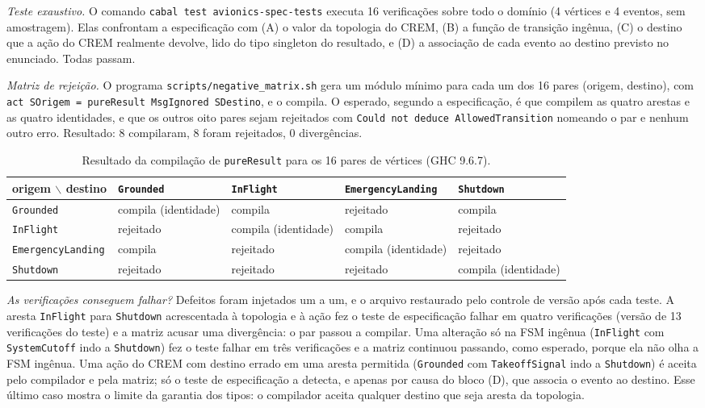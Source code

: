 \documentclass[12pt,a4paper]{article}
\begin{document}
\textit{Teste exaustivo.} O comando \texttt{cabal test avionics-spec-tests} executa 16 verificações sobre todo o domínio (4 vértices e 4 eventos, sem amostragem). Elas confrontam a especificação com (A) o valor da topologia do CREM, (B) a função de transição ingênua, (C) o destino que a ação do CREM realmente devolve, lido do tipo singleton do resultado, e (D) a associação de cada evento ao destino previsto no enunciado. Todas passam.

\textit{Matriz de rejeição.} O programa \texttt{scripts/negative\_matrix.sh} gera um módulo mínimo para cada um dos 16 pares (origem, destino), com \texttt{act SOrigem = pureResult MsgIgnored SDestino}, e o compila. O esperado, segundo a especificação, é que compilem as quatro arestas e as quatro identidades, e que os outros oito pares sejam rejeitados com \texttt{Could not deduce AllowedTransition} nomeando o par e nenhum outro erro. Resultado: 8 compilaram, 8 foram rejeitados, 0 divergências.

\begin{table}[h]
\centering
\scriptsize
\begin{tabular}{|p{3.0cm}|p{2.5cm}|p{2.3cm}|p{3.0cm}|p{2.5cm}|}
\hline
origem $\backslash$ destino & \texttt{Grounded} & \texttt{InFlight} & \texttt{EmergencyLanding} & \texttt{Shutdown} \\
\hline
\texttt{Grounded} & compila (identidade) & compila & rejeitado & compila \\
\hline
\texttt{InFlight} & rejeitado & compila (identidade) & compila & rejeitado \\
\hline
\texttt{EmergencyLanding} & compila & rejeitado & compila (identidade) & rejeitado \\
\hline
\texttt{Shutdown} & rejeitado & rejeitado & rejeitado & compila (identidade) \\
\hline
\end{tabular}
\caption{Resultado da compilação de \texttt{pureResult} para os 16 pares de vértices (GHC 9.6.7).}
\end{table}

\textit{As verificações conseguem falhar?} Defeitos foram injetados um a um, e o arquivo restaurado pelo controle de versão após cada teste. A aresta \texttt{InFlight} para \texttt{Shutdown} acrescentada à topologia e à ação fez o teste de especificação falhar em quatro verificações (versão de 13 verificações do teste) e a matriz acusar uma divergência: o par passou a compilar. Uma alteração só na FSM ingênua (\texttt{InFlight} com \texttt{SystemCutoff} indo a \texttt{Shutdown}) fez o teste falhar em três verificações e a matriz continuou passando, como esperado, porque ela não olha a FSM ingênua. Uma ação do CREM com destino errado em uma aresta permitida (\texttt{Grounded} com \texttt{TakeoffSignal} indo a \texttt{Shutdown}) é aceita pelo compilador e pela matriz; só o teste de especificação a detecta, e apenas por causa do bloco (D), que associa o evento ao destino. Esse último caso mostra o limite da garantia dos tipos: o compilador aceita qualquer destino que seja aresta da topologia.
\end{document}
